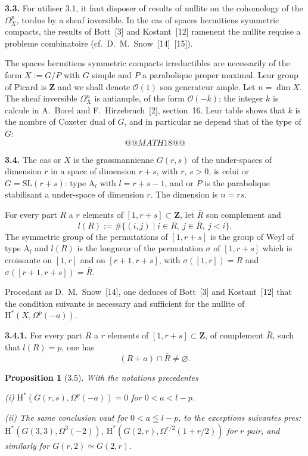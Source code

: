 \documentclass[12pt,a4paper]{article}
\theoremstyle{plain}
\newtheorem{proposition}[theorem]{Proposition}
\theoremstyle{definition}
\begin{document}
\medskip
\textbf{3.3.} For utiliser 3.1, it faut disposer of results of nullite on the cohomology of the $\Omega_X^p$, tordus by a sheaf inversible. In the cas of spaces hermitiens symmetric compacts, the results of Bott~[3] and Kostant~[12] ramenent the nullite requise a probleme combinatoire (cf.\ D.\ M.\ Snow~[14]~[15]).

The spaces hermitiens symmetric compacts irreductibles are necessarily of the form $X := G/P$ with $G$ simple and $P$ a parabolique proper maximal. Leur group of Picard is $\mathbf{Z}$ and we shall denote $\mathscr{O}(1)$ son generateur ample. Let $n = \dim X$. The sheaf inversible $\Omega_X^n$ is antiample, of the form $\mathscr{O}(-k)$; the integer $k$ is calcule in A.\ Borel and F.\ Hirzebruch~[2], section~16. Leur table shows that $k$ is the nombre of Coxeter dual of $G$, and in particular ne depend that of the type of $G$:
\[
@@MATH18@@
\]

\textbf{3.4.} The cas or $X$ is the grassmannienne $G(r, s)$ of the under-spaces of dimension $r$ in a space of dimension $r+s$, with $r$, $s > 0$, is celui or $G = \mathrm{SL}(r+s)$: type $\mathrm{A}_l$ with $l = r+s-1$, and or $P$ is the parabolique stabilisant a under-space of dimension $r$. The dimension is $n = rs$.

For every part $R$ a $r$ elements of $[1, r+s] \subset \mathbf{Z}$, let $\bar{R}$ son complement and
\[
l(R) := \# \{(i,j) \mid i \in R,\ j \in \bar{R},\ j < i\}.
\]
The symmetric group of the permutations of $[1, r+s]$ is the group of Weyl of type $\mathrm{A}_l$ and $l(R)$ is the longueur of the permutation $\sigma$ of $[1, r+s]$ which is croissante on $[1, r]$ and on $[r+1, r+s]$, with $\sigma([1, r]) = R$ and $\sigma([r+1, r+s]) = \bar{R}$.

Procedant as D.\ M.\ Snow~[14], one deduces of Bott~[3] and Kostant~[12] that the condition suivante is necessary and sufficient for the nullite of $\mathrm{H}^*(X, \Omega^p(-a))$.

\medskip
\textbf{3.4.1.} For every part $R$ a $r$ elements of $[1, r+s] \subset \mathbf{Z}$, of complement $\bar{R}$, such that $l(R) = p$, one has
\[
(R+a) \cap \bar{R} \neq \varnothing.
\]

\begin{proposition}[3.5]
With the notations precedentes

\emph{(i)} $\mathrm{H}^*(G(r,s), \Omega^p(-a)) = 0$ for $0 < a < l - p$.

\emph{(ii)} The same conclusion vaut for $0 < a \leqq l - p$, to the exceptions suivantes pres: $\mathrm{H}^*(G(3,3), \Omega^3(-2))$, $\mathrm{H}^*(G(2,r), \Omega^{r/2}(1+r/2))$ for $r$ pair, and similarly for $G(r, 2) \simeq G(2, r)$.
\end{proposition}
\end{document}
